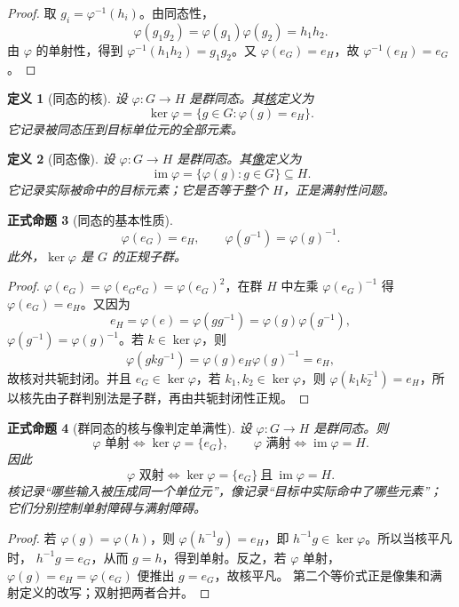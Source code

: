 \documentclass[UTF8,fontset=none,a4paper,11pt]{ctexart}
\theoremstyle{foundation-definition}
\newtheorem{definition}{定义}[section]
\theoremstyle{foundation-theorem}
\theoremstyle{foundation-proposition}
\newtheorem{proposition}[definition]{正式命题}
\theoremstyle{foundation-example}
\theoremstyle{foundation-remark}
\theoremstyle{foundation-theorem}
\newcommand{\term}[2]{\hyperref[#1]{#2}}
\begin{document}
\begin{proof}
取 \(g_i=\varphi^{-1}(h_i)\)。由同态性，
\[
\varphi(g_1g_2)=\varphi(g_1)\varphi(g_2)=h_1h_2.
\]
由 \(\varphi\) 的单射性，得到
\(\varphi^{-1}(h_1h_2)=g_1g_2\)。又
\(\varphi(e_G)=e_H\)，故 \(\varphi^{-1}(e_H)=e_G\)。\end{proof}

\begin{definition}[同态的核]\label{def:kernel}
设 \(\varphi:G\to H\) 是群同态。其\term{def:kernel}{核}定义为
\[
\ker\varphi=\{g\in G:\varphi(g)=e_H\}.
\]
它记录被同态压到目标单位元的全部元素。
\end{definition}

\begin{definition}[同态像]\label{def:image-subgroup}
设 \(\varphi:G\to H\) 是群同态。其\term{def:image-subgroup}{像}定义为
\[
\operatorname{im}\varphi=\{\varphi(g):g\in G\}\subseteq H.
\]
它记录实际被命中的目标元素；它是否等于整个 \(H\)，正是满射性问题。
\end{definition}

\begin{proposition}[同态的基本性质]
\[
\varphi(e_G)=e_H,\qquad
\varphi(g^{-1})=\varphi(g)^{-1}.
\]
此外，\(\ker\varphi\) 是 \(G\) 的正规子群。
\end{proposition}

\begin{proof}
\(\varphi(e_G)=\varphi(e_Ge_G)=\varphi(e_G)^2\)，在群 \(H\) 中左乘
\(\varphi(e_G)^{-1}\) 得 \(\varphi(e_G)=e_H\)。又因为
\[
e_H=\varphi(e)=\varphi(gg^{-1})=\varphi(g)\varphi(g^{-1}),
\]
\(\varphi(g^{-1})=\varphi(g)^{-1}\)。若 \(k\in\ker\varphi\)，则
\[
\varphi(gkg^{-1})=\varphi(g)e_H\varphi(g)^{-1}=e_H,
\]
故核对共轭封闭。并且 \(e_G\in\ker\varphi\)，若 \(k_1,k_2\in\ker\varphi\)，则
\(\varphi(k_1k_2^{-1})=e_H\)，所以核先由子群判别法是子群，再由共轭封闭性正规。
\end{proof}

\begin{proposition}[群同态的核与像判定单满性]\label{prop:group-hom-kernel-image-criteria}
设 \(\varphi:G\to H\) 是群同态。则
\[
\varphi\text{ 单射}\Longleftrightarrow\ker\varphi=\{e_G\},
\qquad
\varphi\text{ 满射}\Longleftrightarrow\operatorname{im}\varphi=H.
\]
因此
\[
\varphi\text{ 双射}
\Longleftrightarrow
\ker\varphi=\{e_G\}\ \text{且}\ \operatorname{im}\varphi=H.
\]
核记录“哪些输入被压成同一个单位元”，像记录“目标中实际命中了哪些元素”；
它们分别控制单射障碍与满射障碍。
\end{proposition}

\begin{proof}
若 \(\varphi(g)=\varphi(h)\)，则
\(\varphi(h^{-1}g)=e_H\)，即 \(h^{-1}g\in\ker\varphi\)。所以当核平凡时，
\(h^{-1}g=e_G\)，从而 \(g=h\)，得到单射。反之，若 \(\varphi\) 单射，
\(\varphi(g)=e_H=\varphi(e_G)\) 便推出 \(g=e_G\)，故核平凡。
第二个等价式正是像集和满射定义的改写；双射把两者合并。\end{proof}
\end{document}
